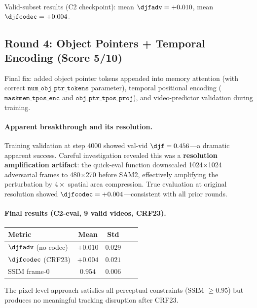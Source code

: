 Valid-subset results (C2 checkpoint): mean $\djfadv = +0.010$, mean $\djfcodec = +0.004$.

\subsection{Round 4: Object Pointers + Temporal Encoding (Score 5/10)}
\label{sec:round4}
Final fix: added object pointer tokens appended into memory attention (with correct $\texttt{num\_obj\_ptr\_tokens}$ parameter), temporal positional encoding ($\texttt{maskmem\_tpos\_enc}$ and $\texttt{obj\_ptr\_tpos\_proj}$), and video-predictor validation during training.

\paragraph{Apparent breakthrough and its resolution.}
Training validation at step 4000 showed val-vid $\djf = 0.456$---a dramatic apparent success. Careful investigation revealed this was a \textbf{resolution amplification artifact}: the quick-eval function downscaled 1024$\times$1024 adversarial frames to 480$\times$270 before SAM2, effectively amplifying the perturbation by $4\times$ spatial area compression. True evaluation at original resolution showed $\djfcodec = +0.004$---consistent with all prior rounds.

\paragraph{Final results (C2-eval, 9 valid videos, CRF23).}
\begin{center}
\small
\begin{tabular}{lcccc}
\toprule
Metric & Mean & Std \\
\midrule
$\djfadv$ (no codec) & $+0.010$ & $0.029$ \\
$\djfcodec$ (CRF23) & $+0.004$ & $0.021$ \\
SSIM frame-0 & $0.954$ & $0.006$ \\
\bottomrule
\end{tabular}
\end{center}

The pixel-level approach satisfies all perceptual constraints (SSIM $\geq 0.95$) but produces no meaningful tracking disruption after CRF23.
